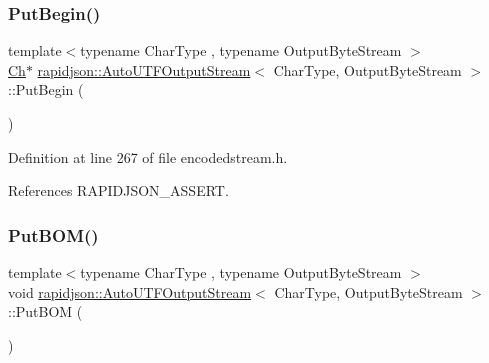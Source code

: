 \subsubsection{\texorpdfstring{PutBegin()}{PutBegin()}}
{\footnotesize\ttfamily template$<$typename Char\+Type , typename Output\+Byte\+Stream $>$ \\
\mbox{\hyperlink{classrapidjson_1_1_auto_u_t_f_output_stream_aaf40884d8f4fbf24ea040d3363c9967e}{Ch}}$\ast$ \mbox{\hyperlink{classrapidjson_1_1_auto_u_t_f_output_stream}{rapidjson\+::\+Auto\+U\+T\+F\+Output\+Stream}}$<$ Char\+Type, Output\+Byte\+Stream $>$\+::Put\+Begin (\begin{DoxyParamCaption}{ }\end{DoxyParamCaption})}



Definition at line 267 of file encodedstream.\+h.


\begin{DoxyCode}{0}

\end{DoxyCode}


References R\+A\+P\+I\+D\+J\+S\+O\+N\+\_\+\+A\+S\+S\+E\+RT.

\mbox{\label{classrapidjson_1_1_auto_u_t_f_output_stream_ab52009c85bdea52aa3b09020f249fbe1}} 
\subsubsection{\texorpdfstring{PutBOM()}{PutBOM()}}
{\footnotesize\ttfamily template$<$typename Char\+Type , typename Output\+Byte\+Stream $>$ \\
void \mbox{\hyperlink{classrapidjson_1_1_auto_u_t_f_output_stream}{rapidjson\+::\+Auto\+U\+T\+F\+Output\+Stream}}$<$ Char\+Type, Output\+Byte\+Stream $>$\+::Put\+B\+OM (\begin{DoxyParamCaption}{ }\end{DoxyParamCaption})\hspace{0.3cm}{\ttfamily [private]}}



